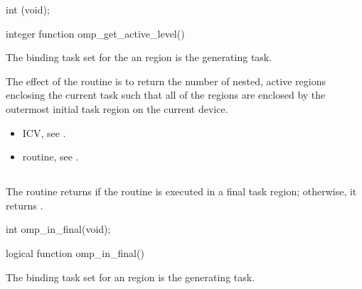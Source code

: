 \format
\ccppspecificstart
\begin{boxedcode}
int (void);
\end{boxedcode}
\ccppspecificend

\pagebreak
\fortranspecificstart
\begin{boxedcode}
integer function omp\_get\_active\_level()
\end{boxedcode}
\fortranspecificend

\binding
The binding task set for the an  region is the generating 
task. 

\effect
The effect of the  routine is to return the number of nested, 
active  regions enclosing the current task such that all of the  
regions are enclosed by the outermost initial task region on the current device. 

\crossreferences
\begin{itemize}
\item {} ICV, see 
.

\item {} routine, see 
. 
\end{itemize}











\subsection{}
\label{subsec:omp_in_final}
\summary
The  routine returns  if the routine is executed in a final task 
region; otherwise, it returns .

\format
\ccppspecificstart
\begin{boxedcode}
int omp\_in\_final(void);
\end{boxedcode}
\ccppspecificend

\fortranspecificstart
\begin{boxedcode}
logical function omp\_in\_final()
\end{boxedcode}
\fortranspecificend

\binding
The binding task set for an  region is the generating task.

